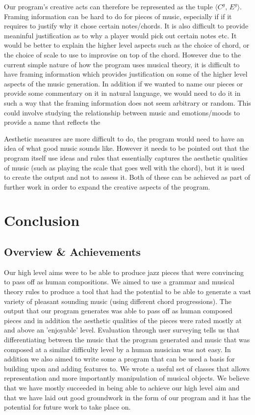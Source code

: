 \documentclass[pdftex,12pt,a4paper]{report}
\begin{document}
Our program's creative acts can therefore be represented as the tuple $\langle${$C^{g}$, $E^{g}$}$\rangle$. 
Framing information can be hard to do for pieces of music, especially if if it requires to justify why it chose certain notes/chords. It is also difficult to provide meaninful justification as to why a player would pick out certain notes etc. It would be better to explain the higher level aspects such as the choice of chord, or the choice of scale to use to improvise on top of the chord. However due to the current simple nature of how the program uses musical theory, it is difficult to have framing information which provides justification on some of the higher level aspects of the music generation. In addition if we wanted to name our pieces or provide some commentary on it in natural language, we would need to do it in such a way that the framing information does not seem arbitrary or random. This could involve studying the relationship between music and emotions/moods to provide a name that reflects the 

Aesthetic measures are more difficult to do, the program would need to have an idea of what good music sounds like. However it needs to be pointed out that the program itself use ideas and rules that essentially captures the aesthetic qualities of music (such as playing the scale that goes well with the chord), but it is used to create the output and not to assess it. Both of these can be achieved as part of further work in order to expand the creative aspects of the program. 


\chapter{Conclusion}

\section{Overview \& Achievements}
Our high level aims were to be able to produce jazz pieces that were convincing to pass off as human compositions. We aimed to use a grammar and musical theory rules to produce a tool that had the potential to be able to generate a vast variety of pleasant sounding music (using different chord progressions). The output that our program generates was able to pass off as human composed pieces and in addition the aesthetic qualities of the pieces were rated mostly at and above an 'enjoyable' level. Evaluation through user surveying tells us that differentiating between the music that the program generated and music that was composed at a similar difficulty level by a human musician was not easy.
In addition we also aimed to write some a program that can be used a basis for building upon and adding features to. We wrote a useful set of classes that allows representation and more importantly manipulation of musical objects. We believe that we have mostly succeeded in being able to achieve our high level aim and that we have laid out good groundwork in the form of our program and it has the potential for future work to take place on.
\end{document}
